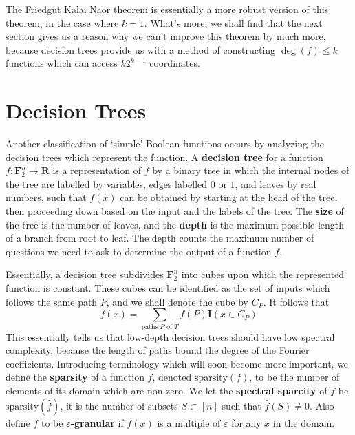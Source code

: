 The Friedgut Kalai Naor theorem is essentially a more robust version of this theorem, in the case where $k = 1$. What's more, we shall find that the next section gives us a reason why we can't improve this theorem by much more, because decision trees provide us with a method of constructing $\deg(f) \leq k$ functions which can access $k2^{k-1}$ coordinates.




\section{Decision Trees}

Another classification of `simple' Boolean functions occurs by analyzing the decision trees which represent the function. A {\bf decision tree} for a function $f: \mathbf{F}_2^n \to \mathbf{R}$ is a representation of $f$ by a binary tree in which the internal nodes of the tree are labelled by variables, edges labelled $0$ or $1$, and leaves by real numbers, such that $f(x)$ can be obtained by starting at the head of the tree, then proceeding down based on the input and the labels of the tree. The {\bf size} of the tree is the number of leaves, and the {\bf depth} is the maximum possible length of a branch from root to leaf. The depth counts the maximum number of questions we need to ask to determine the output of a function $f$.

Essentially, a decision tree subdivides $\mathbf{F}_2^n$ into cubes upon which the represented function is constant. These cubes can be identified as the set of inputs which follows the same path $P$, and we shall denote the cube by $C_P$. It follows that
%
\[ f(x) = \sum_{\text{paths $P$ of $T$}} f(P) \mathbf{I}(x \in C_P) \]
%
This essentially tells us that low-depth decision trees should have low spectral complexity, because the length of paths bound the degree of the Fourier coefficients. Introducing terminology which will soon become more important, we define the {\bf sparsity} of a function $f$, denoted $\text{sparsity}(f)$, to be the number of elements of its domain which are non-zero. We let the {\bf spectral sparcity} of $f$ be $\text{sparsity}(\widehat{f})$, it is the number of subsets $S \subset [n]$ such that $\widehat{f}(S) \neq 0$. Also define $f$ to be {\bf $\varepsilon$-granular} if $f(x)$ is a multiple of $\varepsilon$ for any $x$ in the domain.


